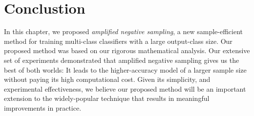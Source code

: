 





\section{Conclustion}
In this chapter, we proposed \emph{amplified negative sampling}, a new sample-efficient method for training multi-class classifiers with a large output-class size. Our proposed method was based on our rigorous mathematical analysis. Our extensive set of experiments demonstrated that amplified negative sampling gives us the best of both worlds: It leads to the higher-accuracy model of a larger sample size without paying its high computational cost. Given its simplicity, and experimental effectiveness, we believe our proposed method will be an important extension to the widely-popular technique that results in meaningful improvements in practice.

\label{sec:NS:conclusion}